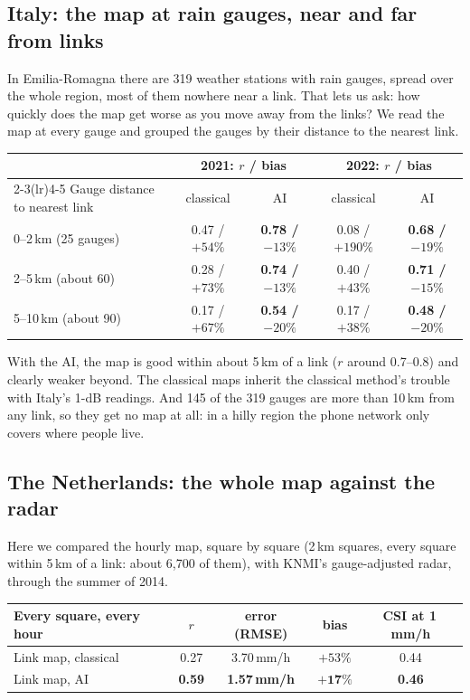 \subsection{Italy: the map at rain gauges, near and far from links}
In Emilia-Romagna there are 319 weather stations with rain gauges, spread over the whole region, most of them nowhere
near a link. That lets us ask: how quickly does the map get worse as you move away from the links? We read the map at
every gauge and grouped the gauges by their distance to the nearest link.
\begin{center}\small
\begin{tabular}{lcccc}
\toprule
& \multicolumn{2}{c}{2021: $r$ / bias} & \multicolumn{2}{c}{2022: $r$ / bias}\\
\cmidrule(lr){2-3}\cmidrule(lr){4-5}
Gauge distance to nearest link & classical & AI & classical & AI\\
\midrule
0--2\,km (25 gauges) & 0.47 / $+54\%$ & \textbf{0.78 / $-13\%$} & 0.08 / $+190\%$ & \textbf{0.68 / $-19\%$}\\
2--5\,km (about 60) & 0.28 / $+73\%$ & \textbf{0.74 / $-13\%$} & 0.40 / $+43\%$ & \textbf{0.71 / $-15\%$}\\
5--10\,km (about 90) & 0.17 / $+67\%$ & \textbf{0.54 / $-20\%$} & 0.17 / $+38\%$ & \textbf{0.48 / $-20\%$}\\
\bottomrule
\end{tabular}
\end{center}
With the AI, the map is good within about 5\,km of a link ($r$ around 0.7--0.8) and clearly weaker beyond. The classical
maps inherit the classical method's trouble with Italy's 1-dB readings. And 145 of the 319 gauges are more than 10\,km
from any link, so they get no map at all: in a hilly region the phone network only covers where people live.

\subsection{The Netherlands: the whole map against the radar}
Here we compared the hourly map, square by square (2\,km squares, every square within 5\,km of a link: about 6{,}700 of
them), with KNMI's gauge-adjusted radar, through the summer of 2014.
\begin{center}\small
\begin{tabular}{lcccc}
\toprule
Every square, every hour & $r$ & error (RMSE) & bias & CSI at 1\,mm/h\\
\midrule
Link map, classical & 0.27 & 3.70\,mm/h & $+53\%$ & 0.44\\
Link map, AI & \textbf{0.59} & \textbf{1.57\,mm/h} & $\mathbf{+17\%}$ & \textbf{0.46}\\
\bottomrule
\end{tabular}
\end{center}

